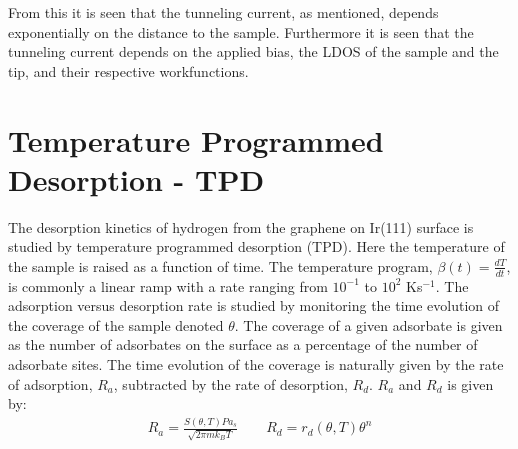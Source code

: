 From this it is seen that the tunneling current, as mentioned, depends exponentially on the distance to the sample. Furthermore it is seen that the tunneling current depends on the applied bias, the LDOS of the sample and the tip, and their respective workfunctions.

\section{Temperature Programmed Desorption - TPD}

The desorption kinetics of hydrogen from the graphene on Ir(111) surface is studied by temperature programmed desorption (TPD). Here the temperature of the sample is raised as a function of time. The temperature program, $\beta (t) = \frac{dT}{dt}$, is commonly a linear ramp with a rate ranging from $10^{-1}$ to $10^2$ Ks$^{-1}$.\cite{TPDbog} The adsorption versus desorption rate is studied by monitoring the time evolution of the coverage of the sample denoted $\theta$. The coverage of a given adsorbate is given as the number of adsorbates on the surface as a percentage of the number of adsorbate sites. The time evolution of the coverage is naturally given by the rate of adsorption, $R_a$, subtracted by the rate of desorption, $R_d$. $R_a$ and $R_d$ is given by:\cite{TPDbog}
\begin{align}
R_a = \frac{S(\theta , T) P a_s}{\sqrt{2\pi m k_B T}} \qquad R_d = r_d(\theta, T)\theta^n
\end{align}

